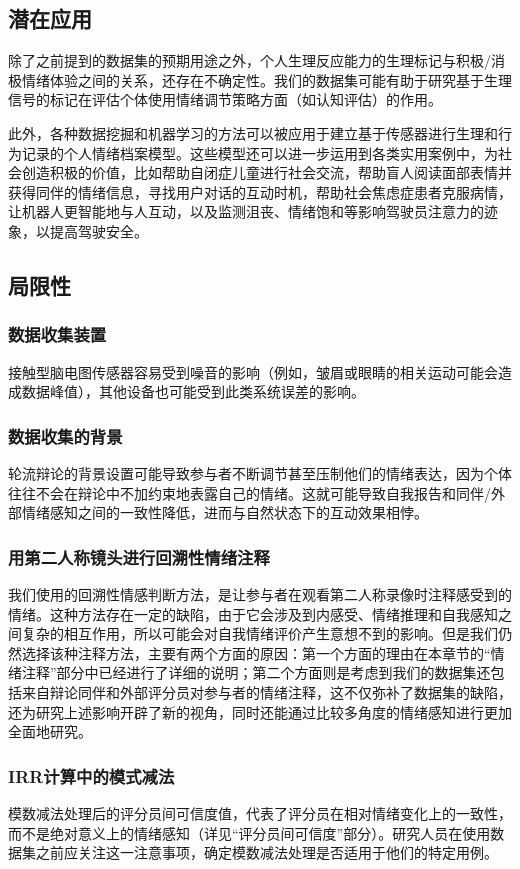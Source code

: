 \subsection{潜在应用}
除了之前提到的数据集的预期用途之外，个人生理反应能力的生理标记与积极/消极情绪体验之间的关系，还存在不确定性。我们的数据集可能有助于研究基于生理信号的标记在评估个体使用情绪调节策略方面（如认知评估）的作用。

此外，各种数据挖掘和机器学习的方法可以被应用于建立基于传感器进行生理和行为记录的个人情绪档案模型。这些模型还可以进一步运用到各类实用案例中，为社会创造积极的价值，比如帮助自闭症儿童进行社会交流，帮助盲人阅读面部表情并获得同伴的情绪信息，寻找用户对话的互动时机，帮助社会焦虑症患者克服病情，让机器人更智能地与人互动，以及监测沮丧、情绪饱和等影响驾驶员注意力的迹象，以提高驾驶安全。

\subsection{局限性}
\subsubsection{数据收集装置}
接触型脑电图传感器容易受到噪音的影响（例如，皱眉或眼睛的相关运动可能会造成数据峰值），其他设备也可能受到此类系统误差的影响。
\subsubsection{数据收集的背景}
轮流辩论的背景设置可能导致参与者不断调节甚至压制他们的情绪表达，因为个体往往不会在辩论中不加约束地表露自己的情绪。这就可能导致自我报告和同伴/外部情绪感知之间的一致性降低，进而与自然状态下的互动效果相悖。
\subsubsection{用第二人称镜头进行回溯性情绪注释}
我们使用的回溯性情感判断方法，是让参与者在观看第二人称录像时注释感受到的情绪。这种方法存在一定的缺陷，由于它会涉及到内感受、情绪推理和自我感知之间复杂的相互作用，所以可能会对自我情绪评价产生意想不到的影响。但是我们仍然选择该种注释方法，主要有两个方面的原因：第一个方面的理由在本章节的“情绪注释”部分中已经进行了详细的说明；第二个方面则是考虑到我们的数据集还包括来自辩论同伴和外部评分员对参与者的情绪注释，这不仅弥补了数据集的缺陷，还为研究上述影响开辟了新的视角，同时还能通过比较多角度的情绪感知进行更加全面地研究。
\subsubsection{IRR计算中的模式减法}
模数减法处理后的评分员间可信度值，代表了评分员在相对情绪变化上的一致性，而不是绝对意义上的情绪感知（详见“评分员间可信度”部分）。研究人员在使用数据集之前应关注这一注意事项，确定模数减法处理是否适用于他们的特定用例。
